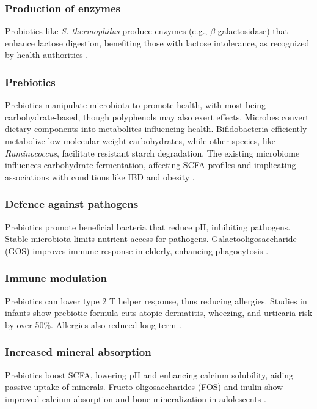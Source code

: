\subsubsection*{Production of enzymes}
Probiotics like \textit{S. thermophilus} produce enzymes (e.g., $\beta$-galactosidase) that enhance lactose digestion, benefiting those with lactose intolerance, as recognized by health authorities \cite*{L10-Pro_Pre}.

\subsubsection*{Prebiotics}
Prebiotics manipulate microbiota to promote health, with most being carbohydrate-based, though polyphenols may also exert effects. Microbes convert dietary components into metabolites influencing health. Bifidobacteria efficiently metabolize low molecular weight carbohydrates, while other species, like \textit{Ruminococcus}, facilitate resistant starch degradation. The existing microbiome influences carbohydrate fermentation, affecting SCFA profiles and implicating associations with conditions like IBD and obesity \cite*{L10-Pro_Pre}.

\subsubsection*{Defence against pathogens}
Prebiotics promote beneficial bacteria that reduce pH, inhibiting pathogens. Stable microbiota limits nutrient access for pathogens. Galactooligosaccharide (GOS) improves immune response in elderly, enhancing phagocytosis \cite*{L10-Pro_Pre}.

\subsubsection*{Immune modulation}
Prebiotics can lower type 2 T helper response, thus reducing allergies. Studies in infants show prebiotic formula cuts atopic dermatitis, wheezing, and urticaria risk by over 50\%. Allergies also reduced long-term \cite*{L10-Pro_Pre}.

\subsubsection*{Increased mineral absorption}
Prebiotics boost SCFA, lowering pH and enhancing calcium solubility, aiding passive uptake of minerals. Fructo-oligosaccharides (FOS) and inulin show improved calcium absorption and bone mineralization in adolescents \cite*{L10-Pro_Pre}.


